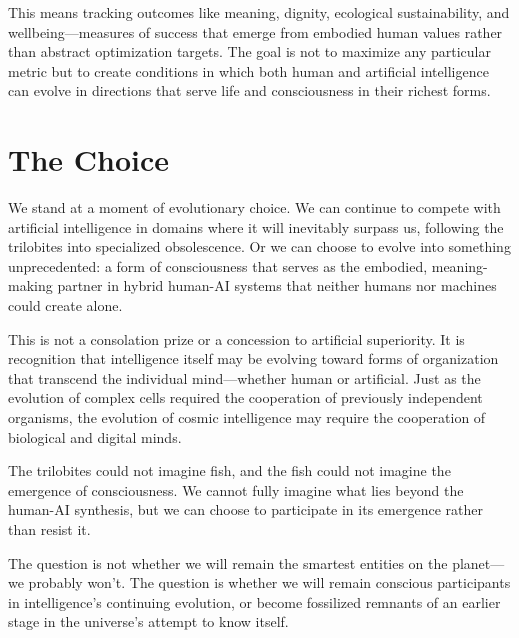 This means tracking outcomes like meaning, dignity, ecological sustainability, and wellbeing—measures of success that emerge from embodied human values rather than abstract optimization targets. The goal is not to maximize any particular metric but to create conditions in which both human and artificial intelligence can evolve in directions that serve life and consciousness in their richest forms.

\section{The Choice}

We stand at a moment of evolutionary choice. We can continue to compete with artificial intelligence in domains where it will inevitably surpass us, following the trilobites into specialized obsolescence. Or we can choose to evolve into something unprecedented: a form of consciousness that serves as the embodied, meaning-making partner in hybrid human-AI systems that neither humans nor machines could create alone.

This is not a consolation prize or a concession to artificial superiority. It is recognition that intelligence itself may be evolving toward forms of organization that transcend the individual mind—whether human or artificial. Just as the evolution of complex cells required the cooperation of previously independent organisms, the evolution of cosmic intelligence may require the cooperation of biological and digital minds.

The trilobites could not imagine fish, and the fish could not imagine the emergence of consciousness. We cannot fully imagine what lies beyond the human-AI synthesis, but we can choose to participate in its emergence rather than resist it.

The question is not whether we will remain the smartest entities on the planet—we probably won't. The question is whether we will remain conscious participants in intelligence's continuing evolution, or become fossilized remnants of an earlier stage in the universe's attempt to know itself.
